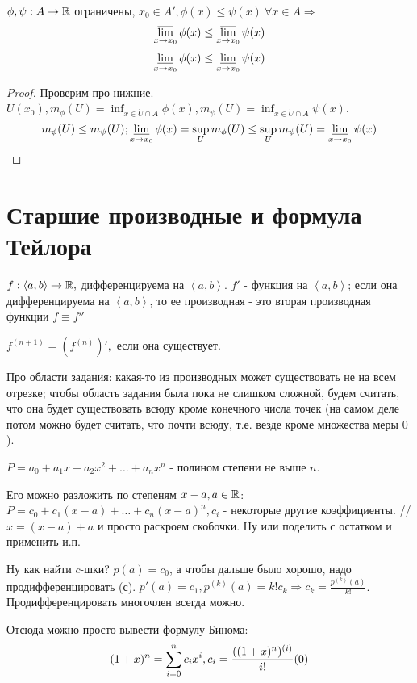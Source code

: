 \documentclass[12pt]{report}
\begin{document}
\begin{lm}
$\phi, \psi: A \to \mathbb{R}$ ограничены, $x_0 \in A', \phi(x) \le \psi(x) ~\forall x \in A \Rightarrow$
$$\varlimsup_{x \to x_0}{\phi(x)} \le \varlimsup_{x \to x_0}{\psi(x)}$$
$$\varliminf_{x \to x_0}{\phi(x)} \le \varliminf_{x \to x_0}{\psi(x)}$$
\end{lm}
\begin{proof}
Проверим про нижние. $U(x_0), m_\phi(U) = \inf_{x \in \dot U \cap A}{\phi(x)}, m_\psi(U) = \inf_{x \in \dot U \cap A}{\psi(x)}$.
$$m_\phi(U) \le m_{\psi}(U); \varliminf_{x \to x_0}{\phi(x)} = \sup_{U}{m_\phi(U)} \le \sup_U{m_\psi(U)} = \varliminf_{x \to x_0}{\psi(x)}$$
\end{proof}

\section{Старшие производные и формула Тейлора}

\begin{defn}
$f: \left<a, b\right> \to \mathbb{R},$ дифференцируема на $\left<a, b\right>$. $f'$ - функция на $\left<a, b\right>$; если она дифференцируема на $\left<a, b\right>$, то ее производная - это вторая производная функции $f \equiv f''$

$f^{(n + 1)} = (f^{(n)})',$ если она существует. 

Про области задания: какая-то из производных может существовать не на всем отрезке; чтобы область задания была пока не слишком сложной, будем считать, что она будет существовать всюду кроме конечного числа точек (на самом деле потом можно будет считать, что почти всюду, т.е. везде кроме множества меры $0$).
\end{defn}

\begin{defn}
$P = a_0 + a_1x + a_2 x^2 + \dots + a_nx^n$ - полином степени не выше $n$. 

Его можно разложить по степеням $x - a, a \in \mathbb{R}$:
$P = c_0 + c_1(x - a) + \dots + c_n(x - a)^n, c_i$ - некоторые другие коэффициенты.
//$x = (x - a) + a$ и просто раскроем скобочки. Ну или поделить с остатком и применить и.п.

Ну как найти $c$-шки? $p(a) = c_0$, а чтобы дальше было хорошо, надо продифференцировать (с). $p'(a) = c_1, p^{(k)}(a) = k! c_k\Rightarrow c_k = \frac{p^{(k)}(a)}{k!}$. Продифференцировать многочлен всегда можно.

Отсюда можно просто вывести формулу Бинома:
$$(1 + x)^n = \sum\limits_{i = 0}^n{c_ix^i}, c_i = \frac{((1 + x)^n)^{(i)}}{i!}(0)$$
\end{defn}
\end{document}
